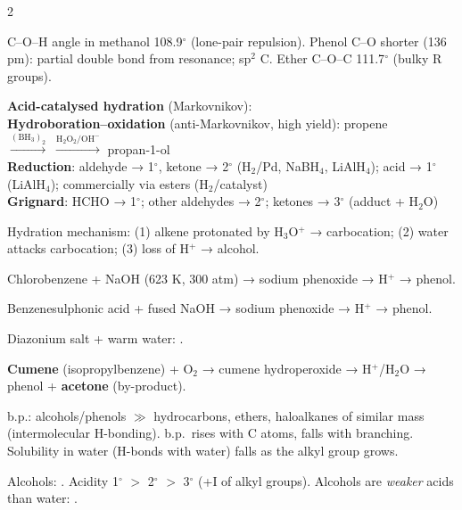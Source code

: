 \documentclass[9pt,a4paper]{extarticle}
\begin{document}
\begin{multicols}{2}
\begin{fl}
\item C--O--H angle in methanol 108.9$^\circ$ (lone-pair repulsion). Phenol C--O shorter (136 pm): partial double bond from resonance; sp$^2$ C. Ether C--O--C 111.7$^\circ$ (bulky R groups).
\end{fl}
\begin{kbox}
\textbf{Acid-catalysed hydration} (Markovnikov): \\
\textbf{Hydroboration--oxidation} (anti-Markovnikov, high yield): propene $\xrightarrow{(\text{BH}_3)_2}\;\xrightarrow{\text{H}_2\text{O}_2/\text{OH}^-}$ propan-1-ol\\
\textbf{Reduction}: aldehyde → 1$^\circ$, ketone → 2$^\circ$ (H$_2$/Pd, NaBH$_4$, LiAlH$_4$); acid → 1$^\circ$ (LiAlH$_4$); commercially via esters (H$_2$/catalyst)\\
\textbf{Grignard}: HCHO → 1$^\circ$; other aldehydes → 2$^\circ$; ketones → 3$^\circ$ (adduct + H$_2$O)
\end{kbox}
\begin{fl}
\item Hydration mechanism: (1) alkene protonated by H$_3$O$^+$ → carbocation; (2) water attacks carbocation; (3) loss of H$^+$ → alcohol.
\end{fl}
\begin{fl}
\item Chlorobenzene + NaOH (623 K, 300 atm) → sodium phenoxide → H$^+$ → phenol.
\item Benzenesulphonic acid + fused NaOH → sodium phenoxide → H$^+$ → phenol.
\item Diazonium salt + warm water: .
\item \textbf{Cumene} (isopropylbenzene) + O$_2$ → cumene hydroperoxide → H$^+$/H$_2$O → phenol + \textbf{acetone} (by-product).
\end{fl}
\begin{fl}
\item b.p.: alcohols/phenols $\gg$ hydrocarbons, ethers, haloalkanes of similar mass (intermolecular H-bonding). b.p.\ rises with C atoms, falls with branching. Solubility in water (H-bonds with water) falls as the alkyl group grows.
\item Alcohols: . Acidity 1$^\circ$ $>$ 2$^\circ$ $>$ 3$^\circ$ (+I of alkyl groups). Alcohols are \emph{weaker} acids than water: .

\end{fl}
\end{multicols}
\end{document}
